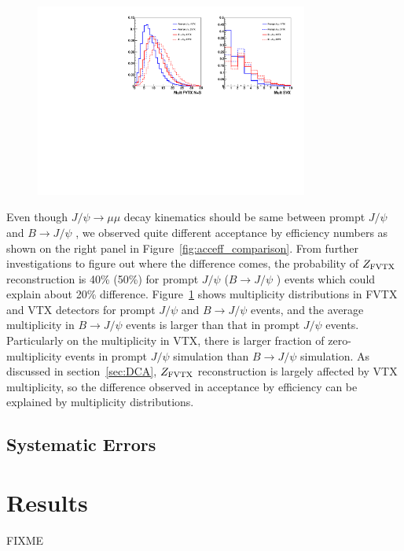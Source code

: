 \documentclass[12pt]{article}
\newcommand{\jpsi}{$J/\psi$ }
\newcommand{\fvtxz}{$Z_{\rm FVTX}$ }
\newcommand{\bjpsi}{${B} \to J/\psi$ }
\begin{document}
\begin{figure}[!htb]
\begin{center}
	\includegraphics[width=0.8\textwidth]{Figures/Run12pp510_sim_FVTX_SVX_multiplicity}
	\caption{}
	\label{fig:mulitplicity_sim}
\end{center}
\end{figure}

Even though $J/\psi\to\mu\mu$ decay kinematics should be same between prompt \jpsi and \bjpsi, we observed quite different acceptance by efficiency numbers as shown on the right panel in Figure~\ref{fig:acceff_comparison}.
From further investigations to figure out where the difference comes, the probability of \fvtxz reconstruction is 40\% (50\%) for prompt \jpsi (\bjpsi) events which could explain about 20\% difference.
Figure~\ref{fig:mulitplicity_sim} shows multiplicity distributions in FVTX and VTX detectors for prompt \jpsi and \bjpsi events, and the average multiplicity in \bjpsi events is larger than that in prompt \jpsi events.
Particularly on the multiplicity in VTX, there is larger fraction of zero-multiplicity events in prompt \jpsi simulation than \bjpsi simulation.
As discussed in section~\ref{sec:DCA}, \fvtxz reconstruction is largely affected by VTX multiplicity, so the difference observed in acceptance by efficiency can be explained by multiplicity distributions.


\subsection{Systematic Errors}
\label{sec:SystErrors}



\section{Results}
{\color{red}FIXME}
\end{document}
